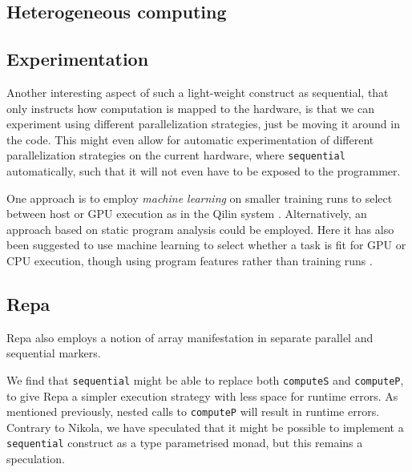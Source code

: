 \subsection{Heterogeneous computing}


\subsection{Experimentation}
Another interesting aspect of such a light-weight construct as
sequential, that only instructs how computation is mapped to the
hardware, is that we can experiment using different parallelization
strategies, just be moving it around in the code. This might even
allow for automatic experimentation of different parallelization
strategies on the current hardware, where \lstinline{sequential} automatically, such that it will not
even have to be exposed to the programmer.

One approach is to employ \emph{machine learning} on smaller training
runs to select between host or GPU execution as in the Qilin system
\cite{luk2009qilin}. Alternatively, an approach based on static
program analysis could be employed. Here it has also been suggested to
use machine learning to select whether a task is fit for GPU or CPU
execution, though using program features rather than training runs
\cite{grewe2011static}.


\subsection{Repa}
Repa also employs a notion of array manifestation in separate parallel and
sequential markers.

We find that \lstinline{sequential} might be able to replace both
\lstinline{computeS} and \lstinline{computeP}, to give Repa a simpler
execution strategy with less space for runtime errors. As mentioned
previously, nested calls to \lstinline{computeP} will result in
runtime errors. Contrary to Nikola, we have speculated that it might
be possible to implement a \lstinline{sequential} construct as a type
parametrised monad, but this remains a speculation.




